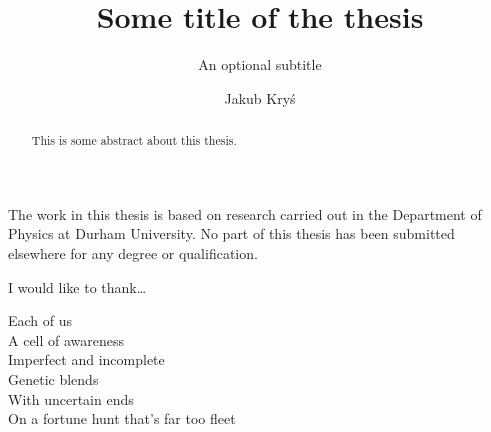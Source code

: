 \documentclass[twoside,openright,frontopenright,halfspacing]{ip3thesis}
\begin{document}
\title{Some title of the thesis}
\subtitle{An optional subtitle}
\author{Jakub Kryś}
\maketitlepage*

\begin{abstract}
%
	This is some abstract about this thesis.
%
\end{abstract}

\disableprotrusion
\tableofcontents*
\listoffigures
\listoftables
\enableprotrusion

\begin{declaration*}
%
	The work in this thesis is based on research carried out in the Department of
	Physics at Durham University. No part of this thesis has been
	submitted elsewhere for any degree or qualification.
%
\end{declaration*}

\begin{acknowledgements*}
%
	I would like to thank\ldots
%
\end{acknowledgements*}

\begin{epigraph*}
%
Each of us\\
A cell of awareness\\
Imperfect and incomplete\\
Genetic blends\\
With uncertain ends\\
On a fortune hunt that's far too fleet
%
\end{epigraph*}


\cleardoublepage









\appendix
%
%



\end{document}
